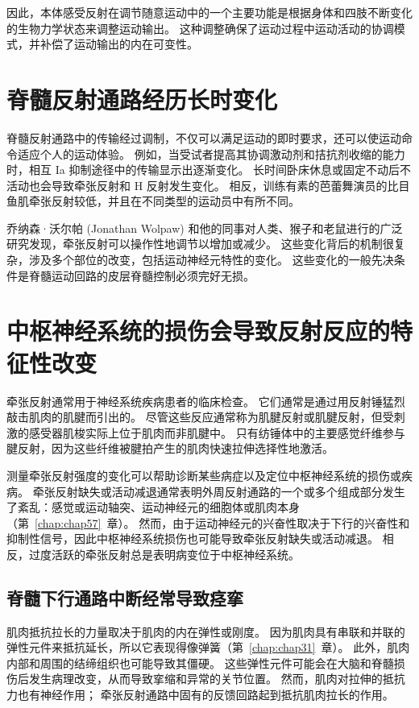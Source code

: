 因此，本体感受反射在调节随意运动中的一个主要功能是根据身体和四肢不断变化的生物力学状态来调整运动输出。
这种调整确保了运动过程中运动活动的协调模式，并补偿了运动输出的内在可变性。



\section{脊髓反射通路经历长时变化}

脊髓反射通路中的传输经过调制，不仅可以满足运动的即时要求，还可以使运动命令适应个人的运动体验。
例如，当受试者提高其协调激动剂和拮抗剂收缩的能力时，相互 Ia 抑制途径中的传输显示出逐渐变化。
长时间卧床休息或固定不动后不活动也会导致牵张反射和 H 反射发生变化。
相反，训练有素的芭蕾舞演员的比目鱼肌牵张反射较低，并且在不同类型的运动员中有所不同。


乔纳森·沃尔帕 (Jonathan Wolpaw) 和他的同事对人类、猴子和老鼠进行的广泛研究发现，牵张反射可以操作性地调节以增加或减少。
这些变化背后的机制很复杂，涉及多个部位的改变，包括运动神经元特性的变化。
这些变化的一般先决条件是脊髓运动回路的皮层脊髓控制必须完好无损。



\section{中枢神经系统的损伤会导致反射反应的特征性改变}

牵张反射通常用于神经系统疾病患者的临床检查。
它们通常是通过用反射锤猛烈敲击肌肉的肌腱而引出的。
尽管这些反应通常称为肌腱反射或肌腱反射，但受刺激的感受器肌梭实际上位于肌肉而非肌腱中。
只有纺锤体中的主要感觉纤维参与腱反射，因为这些纤维被腱拍产生的肌肉快速拉伸选择性地激活。


测量牵张反射强度的变化可以帮助诊断某些病症以及定位中枢神经系统的损伤或疾病。
牵张反射缺失或活动减退通常表明外周反射通路的一个或多个组成部分发生了紊乱：感觉或运动轴突、运动神经元的细胞体或肌肉本身（第~\ref{chap:chap57}~章）。
然而，由于运动神经元的兴奋性取决于下行的兴奋性和抑制性信号，因此中枢神经系统损伤也可能导致牵张反射缺失或活动减退。
相反，过度活跃的牵张反射总是表明病变位于中枢神经系统。



\subsection{脊髓下行通路中断经常导致痉挛}

肌肉抵抗拉长的力量取决于肌肉的内在弹性或刚度。
因为肌肉具有串联和并联的弹性元件来抵抗延长，所以它表现得像弹簧（第~\ref{chap:chap31}~章）。
此外，肌肉内部和周围的结缔组织也可能导致其僵硬。
这些弹性元件可能会在大脑和脊髓损伤后发生病理改变，从而导致挛缩和异常的关节位置。
然而，肌肉对拉伸的抵抗力也有神经作用；
牵张反射通路中固有的反馈回路起到抵抗肌肉拉长的作用。


